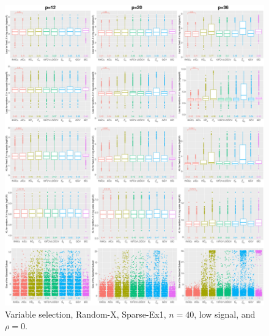\begin{figure}[!ht]
\centering
\includegraphics[width=\textwidth]{figures/supplement/randomx/subset_selection/Sparse-Ex1_n40_lsnr_rho0.eps}
\caption{Variable selection, Random-X, Sparse-Ex1, $n=40$, low signal, and $\rho=0$.}
\end{figure}
\clearpage
